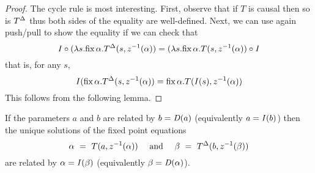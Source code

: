 \begin{proof}
The cycle rule is most interesting. First, observe that if $T$ is causal then so is 
${T}^{\Delta}$ thus both sides of the
equality are well-defined. Next, we can use again push/pull to show the equality 
if we can check that
$$
\mathit{I}\circ(\lambda s. \mbox{fix}\,\alpha.{T}^{\Delta}(s,z^{-1}(\alpha)) =
(\lambda s. \mbox{fix}\,\alpha.T(s,z^{-1}(\alpha))\circ\mathit{I}
$$
that is, for any $s$,
$$
\mathit{I}(\mbox{fix}\,\alpha.{T}^{\Delta}(s,z^{-1}(\alpha)) =
\mbox{fix}\,\alpha.T(\mathit{I}(s),z^{-1}(\alpha))
$$
This follows from the following lemma.
\end{proof}

\begin{lemma}
\label{lemma-delta-fix}
If the parameters $a$ and $b$ are related by $b=\mathit{D}(a)$ (equivalently $a=\mathit{I}(b)$)
then the unique solutions of the fixed point equations
$$
\alpha~=~ T(a,z^{-1}(\alpha))~~~~\mbox{and}~~~~
\beta~=~{T}^{\Delta}(b,z^{-1}(\beta))
$$
are related by $\alpha=\mathit{I}(\beta)$ (equivalently $\beta=\mathit{D}(\alpha)$). 
\end{lemma}
